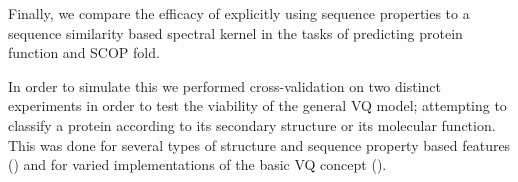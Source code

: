 Finally, we compare the efficacy of explicitly using sequence properties to a sequence similarity based spectral kernel \citep{Leslie2002} in the tasks of predicting protein function and SCOP fold.




In order to simulate this we performed cross-validation on two distinct experiments in order to test the viability of the general VQ model; attempting to classify a protein according to its secondary structure or its molecular function.  This was done for several types of structure and sequence property based features () and for varied implementations of the basic VQ concept ().





